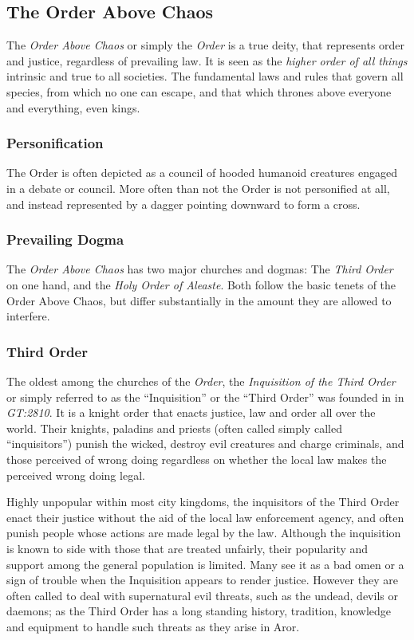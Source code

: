 \subsection*{The Order Above Chaos}

The \emph{Order Above Chaos} or simply the \emph{Order} is a true deity, that
represents order and justice, regardless of prevailing law. It is seen as the
\emph{higher order of all things} intrinsic and true to all societies. The
fundamental laws and rules that govern all species, from which no one can
escape, and that which thrones above everyone and everything, even kings.

\subsubsection*{Personification}

The Order is often depicted as a council of hooded humanoid creatures engaged
in a debate or council. More often than not the Order is not personified at
all, and instead represented by a dagger pointing downward to form a cross.

\subsubsection*{Prevailing Dogma}

The \emph{Order Above Chaos} has two major churches and dogmas: The
\emph{Third Order} on one hand, and the \emph{Holy Order of Aleaste}. Both
follow the basic tenets of the Order Above Chaos, but differ substantially in
the amount they are allowed to interfere.

\subsubsection*{Third Order}

The oldest among the churches of the \emph{Order}, the \emph{Inquisition of
  the Third Order} or simply referred to as the ``Inquisition'' or the
``Third Order'' was founded in in \emph{GT:2810}. It is a knight order that
enacts justice, law and order all over the world. Their knights, paladins and
priests (often called simply called ``inquisitors'') punish the wicked, destroy
evil creatures and charge criminals, and those perceived of wrong doing
regardless on whether the local law makes the perceived wrong doing legal.

Highly unpopular within most city kingdoms, the inquisitors of the Third Order
enact their justice without the aid of the local law enforcement agency, and
often punish people whose actions are made legal by the law. Although the
inquisition is known to side with those that are treated unfairly, their
popularity and support among the general population is limited. Many see it
as a bad omen or a sign of trouble when the Inquisition appears to render
justice. However they are often called to deal with supernatural evil threats,
such as the undead, devils or daemons; as the Third Order has a long standing
history, tradition, knowledge and equipment to handle such threats as they
arise in Aror.

